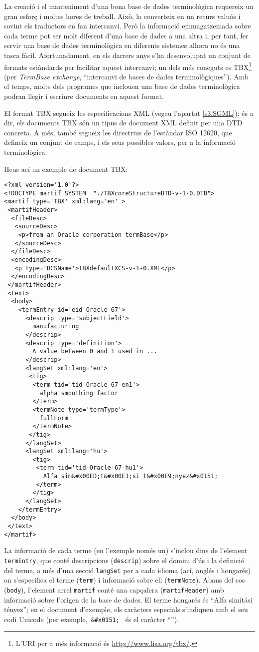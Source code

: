 La creació i el manteniment d'una bona base de dades terminològica
requereix un gran esforç i moltes hores de treball. Això, la
converteix en un recurs valuós i sovint els traductors en fan
intercanvi. Però la informació emmagatzemada sobre cada terme pot ser
molt diferent d'una base de dades a una altra i, per tant, fer servir
una base de dades terminològica en diferents sistemes alhora no és una
tasca fàcil. Afortunadament, en els darrers anys s'ha desenvolupat un
conjunt de formats estàndards per facilitar aquest intercanvi; un dels
més coneguts es TBX\footnote{L'URI per a més informació és 
\url{http://www.lisa.org/tbx/}.} 
(per \emph{TermBase exchange}, ``intercanvi de bases de dades 
terminològiques''). Amb el temps, 
molts dels programes que inclouen una base de dades terminològica
podran llegir i escriure documents en aquest format.

El format TBX segueix les especificacions XML (vegeu l'apartat 
\ref{s3:SGML}); és a dir, els documents TBX són un tipus de document
XML definit per una DTD concreta. A més, també segueix les directrius
de l'estàndar ISO 12620, que defineix un conjunt de camps, i els
seus possibles valors, per a la informació terminològica.

Heus ací un exemple de document TBX:
\begin{verbatim}
<?xml version='1.0'?>
<!DOCTYPE martif SYSTEM  "./TBXcoreStructureDTD-v-1-0.DTD">
<martif type='TBX' xml:lang='en' >
 <martifHeader>
  <fileDesc>
   <sourceDesc>
    <p>from an Oracle corporation termBase</p>
   </sourceDesc>
  </fileDesc>
  <encodingDesc>
   <p type='DCSName'>TBXdefaultXCS-v-1-0.XML</p>
  </encodingDesc>
 </martifHeader>
 <text> 
  <body>
    <termEntry id='eid-Oracle-67'>
      <descrip type='subjectField'>
        manufacturing
      </descrip>
      <descrip type='definition'>
        A value between 0 and 1 used in ...
      </descrip>
      <langSet xml:lang='en'>
       <tig>
        <term tid='tid-Oracle-67-en1'>
          alpha smoothing factor
        </term>
        <termNote type='termType'>
          fullForm
        </termNote>
       </tig>
      </langSet>
      <langSet xml:lang='hu'>
        <tig>
         <term tid='tid-Oracle-67-hu1'>
           Alfa sim&#x00ED;t&#x00E1;si t&#x00E9;nyez&#x0151; 
         </term>
        </tig>
      </langSet>
    </termEntry>
  </body> 
 </text>
</martif>
\end{verbatim}

La informació de cada terme (en l'exemple només un) s'inclou dins de
l'element {\tt termEntry}, que conté descripcions (\texttt{descrip})
sobre el domini d'ús i la definició del terme, a més d'una secció 
{\tt langSet} per a cada idioma (ací, anglés i hongarés) on
s'especifica el terme (\texttt{term}) i informació sobre ell 
(\texttt{termNote}). Abans del cos (\texttt{body}), l'element 
arrel {\tt martif} conté una capçalera (\texttt{martifHeader})
amb informació sobre l'origen de la base de dades. El terme hongarés
és ``{Alfa simítási tényez}''; en
el document d'exemple, els caràcters especials s'indiquen amb el seu
codi Unicode (per exemple,\, \verb+&#x0151;+ \ és el caràcter
``{}'').



